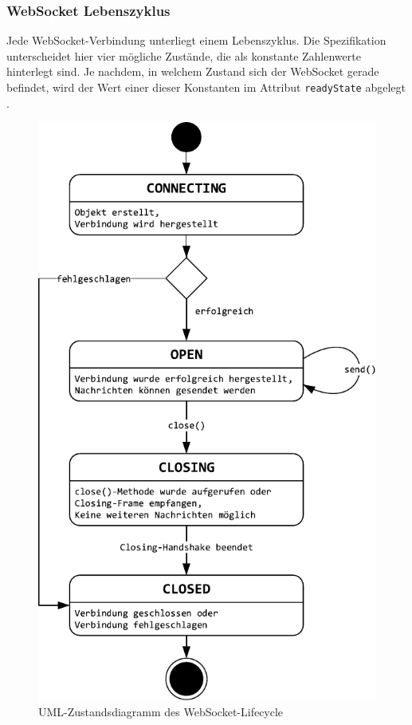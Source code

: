 \documentclass[11pt,a4paper,titlepage]{scrartcl}
\numberwithin{equation}{section}
\begin{document}
\subsubsection{WebSocket Lebenszyklus}
Jede WebSocket-Verbindung unterliegt einem Lebenszyklus. Die Spezifikation unterscheidet hier vier mögliche Zustände, die als konstante Zahlenwerte hinterlegt sind. Je nachdem, in welchem Zustand sich der WebSocket gerade befindet, wird der Wert einer dieser Konstanten im Attribut \texttt{readyState} abgelegt \autocite{whatwg_html_2010}. \newpage
\begin{figure}[ht] \label{fig:wsLifeCycle}
	\begin{center}
		\includegraphics[scale=0.75]{img/wslifecycle.pdf}
		\caption{UML-Zustandsdiagramm des WebSocket-Lifecycle}
		\label{fig:wsAPIZustand}
	\end{center}
\end{figure}
\end{document}
